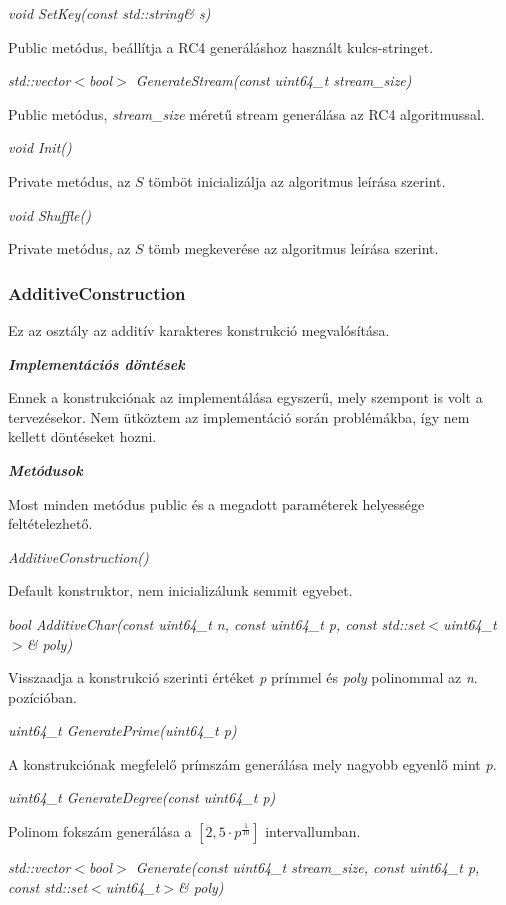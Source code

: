 \documentclass[12pt]{article}
\begin{document}
\textit{void SetKey(const std::string\& s)}

Public metódus, beállítja a RC4 generáláshoz használt kulcs-stringet.

\textit{std::vector$<$bool$>$ GenerateStream(const uint64\_t stream\_size)}

Public metódus, \textit{stream\_size} méretű stream generálása az RC4 algoritmussal.

\textit{void Init()}

Private metódus, az $S$ tömböt inicializálja az algoritmus leírása szerint.

\textit{void Shuffle()}

Private metódus, az $S$ tömb megkeverése az algoritmus leírása szerint.

\subsubsection*{AdditiveConstruction}
Ez az osztály az additív karakteres konstrukció megvalósítása.

\textbf{\textit{Implementációs döntések}}

Ennek a konstrukciónak az implementálása egyszerű, mely szempont is volt a tervezésekor. Nem ütköztem az implementáció során problémákba, így nem kellett döntéseket hozni.

\textbf{\textit{Metódusok}}

Most minden metódus public és a megadott paraméterek helyessége feltételezhető.

\textit{AdditiveConstruction()}

Default konstruktor, nem inicializálunk semmit egyebet.

\textit{bool AdditiveChar(const uint64\_t n, const uint64\_t p, const std::set$<$uint64\_t$>$\& poly)}

Visszaadja a konstrukció szerinti értéket \textit{p} prímmel és \textit{poly} polinommal az \textit{n}. pozícióban.

\textit{uint64\_t GeneratePrime(uint64\_t p)}

A konstrukciónak megfelelő prímszám generálása mely nagyobb egyenlő mint \textit{p}.

\textit{uint64\_t GenerateDegree(const uint64\_t p)}

Polinom fokszám generálása a $[2, 5\cdot p^\frac{1}{10}]$ intervallumban.

\textit{std::vector$<$bool$>$ Generate(const uint64\_t stream\_size, const uint64\_t p, const std::set$<$uint64\_t$>$\& poly)}
\end{document}

